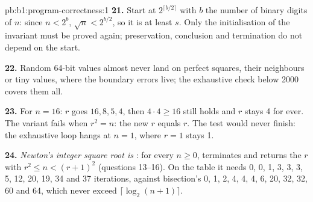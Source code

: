 \begin{solution}{pb:b1:program-correctness:1}
\textbf{21.} Start at $2^{\lceil b/2 \rceil}$ with $b$ the number of binary digits of $n$: since $n < 2^b$, $\sqrt{n} <
2^{b/2}$, so it is at least $s$. Only the initialisation of the invariant must be proved again; preservation,
conclusion and termination do not depend on the start.

\textbf{22.} Random 64-bit values almost never land on perfect squares, their neighbours or tiny values, where the
boundary errors live; the exhaustive check below 2000 covers them all.

\textbf{23.} For $n = 16$: $r$ goes $16, 8, 5, 4$, then $4 \cdot 4 \geq 16$ still holds and $r$ stays 4 for ever. The
variant fails when $r^2 = n$: the new $r$ equals $r$. The test would never finish: the
exhaustive loop hangs at $n = 1$, where $r = 1$ stays 1.

\textbf{24.} \emph{Newton's integer square root is }: for every $n \geq 0$, 
terminates and returns the $r$ with $r^2 \leq n < (r + 1)^2$ (questions 13--16). On the table it needs 0, 0, 1, 3, 3,
3, 5, 12, 20, 19, 34 and 37 iterations, against bisection's 0, 1, 2, 4, 4, 4, 6, 20, 32, 32, 60 and 64, which never
exceed $\lceil \log_2(n + 1) \rceil$.
\end{solution}
